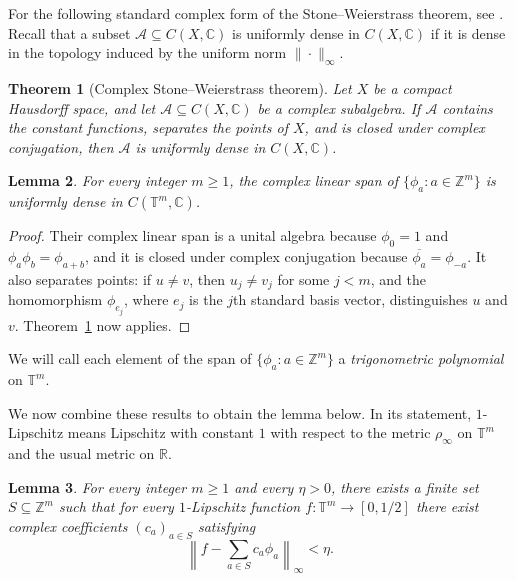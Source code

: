 \documentclass[10pt,a4paper]{amsart}
\newtheorem{theorem}{Theorem}[section]
\newtheorem{lemma}[theorem]{Lemma}
\newcommand{\T}{\mathbb T}
\newcommand{\Z}{\mathbb Z}
\begin{document}
For the following standard complex form of the Stone--Weierstrass theorem,
see \cite[Theorem~7.33]{Rudin1976}.  Recall that a subset
$\mathcal A\subseteq C(X,\mathbb C)$ is uniformly dense in
$C(X,\mathbb C)$ if it is dense in the topology induced by the uniform norm
$\|\cdot\|_\infty$.

\begin{theorem}[Complex Stone--Weierstrass theorem]
\label{thm:complex-stone-weierstrass}
Let $X$ be a compact Hausdorff space, and let
$\mathcal A\subseteq C(X,\mathbb C)$ be a complex subalgebra.  If
$\mathcal A$ contains the constant functions, separates the points of $X$,
and is closed under complex conjugation, then $\mathcal A$ is uniformly dense
in $C(X,\mathbb C)$.
\end{theorem}

\begin{lemma}
\label{lem:trigonometric-stone-weierstrass}
For every integer $m\geq1$, the complex linear span of
$\{\phi_a:a\in\Z^m\}$ is uniformly dense in $C(\T^m,\mathbb C)$.
\end{lemma}

\begin{proof}
Their complex linear span is a unital algebra because
$\phi_0=1$ and $\phi_a\phi_b=\phi_{a+b}$, and it is closed under complex
conjugation because $\overline{\phi_a}=\phi_{-a}$.  It also separates
points: if $u\neq v$, then $u_j\neq v_j$ for some $j<m$, and the homomorphism
$\phi_{e_j}$, where $e_j$ is the $j$th standard basis vector, distinguishes
$u$ and $v$.
Theorem~\ref{thm:complex-stone-weierstrass} now applies.
\end{proof}

We will call each element of the span of $\{\phi_a:a\in\Z^m\}$ a
\emph{trigonometric polynomial} on $\T^m$.

We now combine these results to obtain the lemma below.
In its statement, $1$-Lipschitz means Lipschitz with constant $1$ with respect
to the metric $\rho_\infty$ on $\T^m$ and the usual metric on $\mathbb R$.

\begin{lemma}\label{lem:uniform-frequency-set}
For every integer $m\geq1$ and every $\eta>0$, there exists a finite set
$S\subseteq\Z^m$ such that for every $1$-Lipschitz function
$f:\T^m\to[0,1/2]$ there exist complex coefficients $(c_a)_{a\in S}$
satisfying
\[
 \left\|f-\sum_{a\in S}c_a\phi_a\right\|_\infty<\eta.
\]
\end{lemma}
\end{document}
